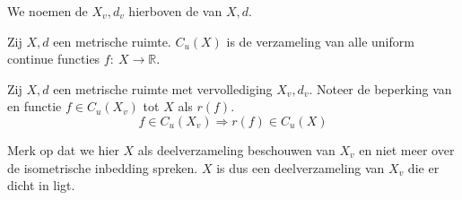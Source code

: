 \documentclass[main.tex]{subfiles}
\begin{document}
\begin{de}
  We noemen de $X_{v},d_{v}$ hierboven de  van $X,d$.
\end{de}

\begin{de}
  Zij $X,d$ een metrische ruimte.
  $C_{u}(X)$ is de verzameling van alle uniform continue functies $f:\ X \rightarrow \mathbb{R}$.
\end{de}

\begin{st}
  Zij $X,d$ een metrische ruimte met vervollediging $X_{v},d_{v}$.
  Noteer de beperking van en functie $f\in C_{u}(X_{v})$ tot $X$ als $r(f)$.
  \[ f \in C_{u}(X_{v}) \Rightarrow r(f) \in C_{u}(X) \]

\end{st}

\begin{opm}
  Merk op dat we hier $X$ als deelverzameling beschouwen van $X_{v}$ en niet meer over de isometrische inbedding spreken.
  $X$ is dus een deelverzameling van $X_{v}$ die er dicht in ligt.
\end{opm}
\end{document}
